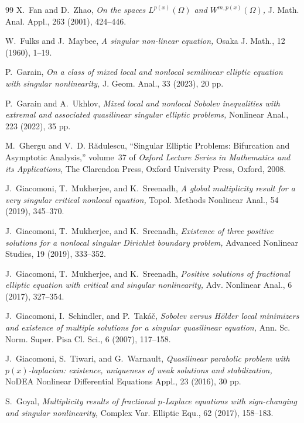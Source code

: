 \documentclass[11pt]{article}
\begin{document}
\begin{thebibliography}{99}
X.~Fan and D.~Zhao,
{\it On the spaces {$L^{p(x)}(\Omega)$} and {$W^{m,p(x)}(\Omega)$},}
J. Math. Anal. Appl., 263 (2001), 424--446.

W.~Fulks and J.~Maybee,
{\it A singular non-linear equation,}
Osaka J. Math., 12 (1960), 1--19.

P.~Garain,
{\it On a class of mixed local and nonlocal semilinear elliptic equation
  with singular nonlinearity,}
J. Geom. Anal., 33 (2023), 20 pp.

P.~Garain and A.~Ukhlov,
{\it Mixed local and nonlocal {S}obolev inequalities with extremal and
  associated quasilinear singular elliptic problems,}
Nonlinear Anal., 223 (2022), 35 pp.

M.~Ghergu and V.~D. R{\u{a}}dulescu,
``Singular Elliptic Problems: Bifurcation and Asymptotic
  Analysis,''
  volume~37 of {\em Oxford Lecture Series in Mathematics and its
  Applications},
The Clarendon Press, Oxford University Press, Oxford, 2008.

J.~Giacomoni, T.~Mukherjee, and K.~Sreenadh,
{\it A global multiplicity result for a very singular critical nonlocal
  equation,}
Topol. Methods Nonlinear Anal., 54 (2019), 345--370.

J.~Giacomoni, T.~Mukherjee, and K.~Sreenadh,
{\it Existence of three positive solutions for a nonlocal singular
  {D}irichlet boundary problem,}
Advanced Nonlinear Studies, 19 (2019), 333--352.

J.~Giacomoni, T.~Mukherjee, and K.~Sreenadh,
{\it Positive solutions of fractional elliptic equation with critical and
  singular nonlinearity,}
Adv. Nonlinear Anal., 6 (2017), 327--354.

J.~Giacomoni, I.~Schindler, and P.~Tak\'a\v{c},
{\it Sobolev versus {H\"older} local minimizers and existence of multiple
  solutions for a singular quasilinear equation,}
Ann. Sc. Norm. Super. Pisa Cl. Sci., 6 (2007), 117--158.

J.~Giacomoni, S.~Tiwari, and G.~Warnault,
{\it Quasilinear parabolic problem with {$p(x)$}-laplacian: existence,
  uniqueness of weak solutions and stabilization,}
NoDEA Nonlinear Differential Equations Appl., 23 (2016), 30 pp.

S.~Goyal,
{\it Multiplicity results of fractional {$p$}-{L}aplace equations with
  sign-changing and singular nonlinearity,}
Complex Var. Elliptic Equ., 62 (2017), 158--183.


\end{thebibliography}
\end{document}
